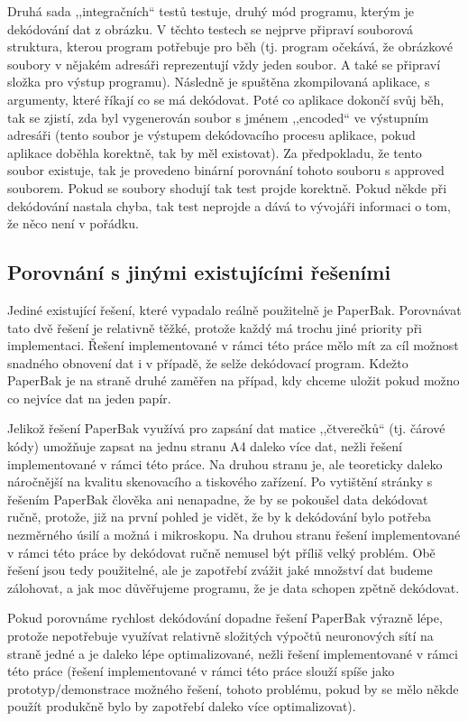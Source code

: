 \documentclass[conference]{IEEEtran}
\begin{document}
Druhá sada ,,integračních`` testů testuje, druhý mód programu, kterým je dekódování dat z obrázku. V těchto testech se nejprve připraví souborová struktura, kterou program potřebuje pro běh (tj. program očekává, že obrázkové soubory v nějakém adresáři reprezentují vždy jeden soubor. A také se připraví složka pro výstup programu). Následně je spuštěna zkompilovaná aplikace, s argumenty, které říkají co se má dekódovat. Poté co aplikace dokončí svůj běh, tak se zjistí, zda byl vygenerován soubor s jménem ,,encoded`` ve výstupním adresáři (tento soubor je výstupem dekódovacího procesu aplikace, pokud aplikace doběhla korektně, tak by měl existovat). Za předpokladu, že tento soubor existuje, tak je provedeno binární porovnání tohoto souboru s approved souborem. Pokud se soubory shodují tak test projde korektně. Pokud někde při dekódování nastala chyba, tak test neprojde a dává to vývojáři informaci o tom, že něco není v pořádku.

\subsection{Porovnání s jinými existujícími řešeními}

Jediné existující řešení, které vypadalo reálně použitelně je PaperBak. Porovnávat tato dvě řešení je relativně těžké, protože každý má trochu jiné priority při implementaci. Řešení implementované v rámci této práce mělo mít za cíl možnost snadného obnovení dat i v případě, že selže dekódovací program. Kdežto PaperBak je na straně druhé zaměřen na případ, kdy chceme uložit pokud možno co nejvíce dat na jeden papír. 

Jelikož řešení PaperBak využívá pro zapsání dat matice ,,čtverečků`` (tj. čárové kódy) umožňuje zapsat na jednu stranu A4 daleko více dat, nežli řešení implementované v rámci této práce. Na druhou stranu je, ale teoreticky daleko náročnější na kvalitu skenovacího a tiskového zařízení. Po vytištění stránky s řešením PaperBak člověka ani nenapadne, že by se pokoušel data dekódovat ručně, protože, již na první pohled je vidět, že by k dekódování bylo potřeba nezměrného úsilí a možná i mikroskopu. Na druhou stranu řešení implementované v rámci této práce by dekódovat ručně nemusel být příliš velký problém. Obě řešení jsou tedy použitelné, ale je zapotřebí zvážit jaké množství dat budeme zálohovat, a jak moc důvěřujeme programu, že je data schopen zpětně dekódovat. 

Pokud porovnáme rychlost dekódování dopadne řešení PaperBak výrazně lépe, protože nepotřebuje využívat relativně složitých výpočtů neuronových sítí na straně jedné a je daleko lépe optimalizované, nežli řešení implementované v rámci této práce (řešení implementované v rámci této práce slouží spíše jako prototyp/demonstrace možného řešení, tohoto problému, pokud by se mělo někde použít produkčně bylo by zapotřebí daleko více optimalizovat).
\end{document}
